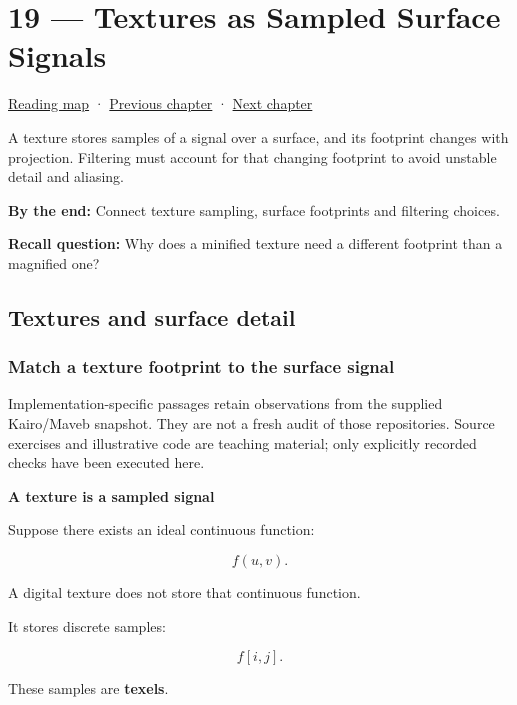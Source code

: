 \hypertarget{03-visual-computing-i-ch019}{}
\chapter{19 --- Textures as Sampled Surface Signals}\label{03-visual-computing-i-ch019-textures-as-sampled-surface-signals}

\hyperref[volume-reading-map]{Reading map} · \hyperref[03-visual-computing-i-ch018-c-representation-ownership-and-lifetime]{Previous chapter} · \hyperref[03-visual-computing-i-ch020-geometry-queries-from-scene-to-contact]{Next chapter}

A texture stores samples of a signal over a surface, and its footprint changes with projection. Filtering must account for that changing footprint to avoid unstable detail and aliasing.

\textbf{By the end:} Connect texture sampling, surface footprints and filtering choices.

\textbf{Recall question:} Why does a minified texture need a different footprint than a magnified one?

\section{Textures and surface detail}\label{03-visual-computing-i-ch019-textures-and-surface-detail}

\subsection{Match a texture footprint to the surface signal}\label{03-visual-computing-i-ch019-match-a-texture-footprint-to-the-surface-signal}

Implementation-specific passages retain observations from the supplied Kairo/Maveb snapshot. They are not a fresh audit of those repositories. Source exercises and illustrative code are teaching material; only explicitly recorded checks have been executed here.

\textbf{A texture is a sampled signal}

Suppose there exists an ideal continuous function:

\[
f(u,v).
\]

A digital texture does not store that continuous function.

It stores discrete samples:

\[
f[i,j].
\]

These samples are \textbf{texels}.


